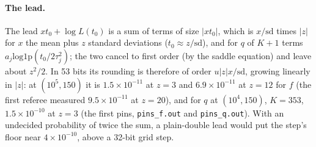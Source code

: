 \paragraph{The lead.} The lead $xt_0+\log L(t_0)$ is a sum of terms of size $|xt_0|$, which is $x/\mathrm{sd}$
times $|z|$ for $x$ the mean plus $z$ standard deviations ($t_0\approx z/\mathrm{sd}$), and for $q$ of $K+1$ terms
$a_j\mathrm{log1p}(t_0/2\tau_j^2)$; the two cancel to first order (by the saddle equation) and leave about
$z^2/2$. In 53 bits its rounding is therefore of order $u|z|x/\mathrm{sd}$, growing linearly in $|z|$: at
$(10^5,150)$ it is $1.5\times10^{-11}$ at $z=3$ and $6.9\times10^{-11}$ at $z=12$ for $f$ (the first referee
measured $9.5\times10^{-11}$ at $z=20$), and for $q$ at $(10^4,150)$, $K=353$, $1.5\times10^{-10}$ at $z=3$ (the
first pins, \texttt{pins\_f.out} and \texttt{pins\_q.out}). With an undecided probability of twice the sum, a
plain-double lead would put the step's floor near $4\times10^{-10}$, above a 32-bit grid step.

